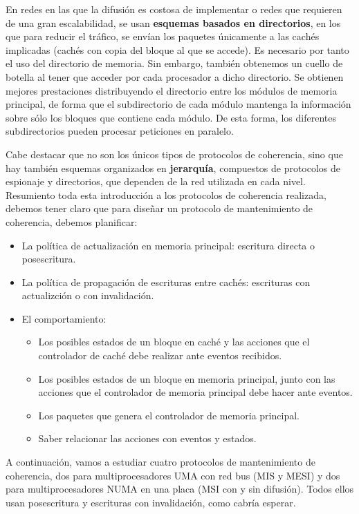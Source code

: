 En redes en las que la difusión es costosa de implementar o redes que requieren de una gran escalabilidad, se usan \textbf{esquemas basados en directorios}, en los que para reducir el tráfico, se envían los paquetes únicamente a las cachés implicadas (cachés con copia del bloque al que se accede). Es necesario por tanto el uso del directorio de memoria. Sin embargo, también obtenemos un cuello de botella al tener que acceder por cada procesador a dicho directorio. Se obtienen mejores prestaciones distribuyendo el directorio entre los módulos de memoria principal, de forma que el subdirectorio de cada módulo mantenga la información sobre sólo los bloques que contiene cada módulo. De esta forma, los diferentes subdirectorios pueden procesar peticiones en paralelo.

Cabe destacar que no son los únicos tipos de protocolos de coherencia, sino que hay también esquemas organizados en \textbf{jerarquía}, compuestos de protocolos de espionaje y directorios, que dependen de la red utilizada en cada nivel.\\

Resumiento toda esta introducción a los protocolos de coherencia realizada, debemos tener claro que para diseñar un protocolo de mantenimiento de coherencia, debemos planificar:
\begin{itemize}
    \item La política de actualización en memoria principal: escritura directa o posescritura.
    \item La política de propagación de escrituras entre cachés: escrituras con actualizción o con invalidación.
    \item El comportamiento:
        \begin{itemize}
            \item Los posibles estados de un bloque en caché y las acciones que el controlador de caché debe realizar ante eventos recibidos.
            \item Los posibles estados de un bloque en memoria principal, junto con las acciones que el controlador de memoria principal debe hacer ante eventos.
            \item Los paquetes que genera el controlador de memoria principal.
            \item Saber relacionar las acciones con eventos y estados.
        \end{itemize}
\end{itemize}
A continuación, vamos a estudiar cuatro protocolos de mantenimiento de coherencia, dos para multiprocesadores UMA con red bus (MIS y MESI) y dos para multiprocesadores NUMA en una placa (MSI con y sin difusión). Todos ellos usan posescritura y escrituras con invalidación, como cabría esperar.\\

